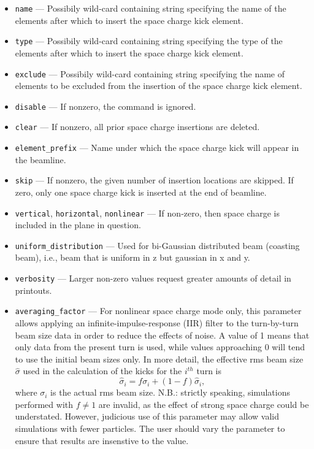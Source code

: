 \documentclass[11pt]{article}
\begin{document}
\begin{itemize}
\item \verb|name| --- Possibily wild-card containing string specifying the
	name of the elements after which to insert the space charge kick element.
\item \verb|type| --- Possibily wild-card containing string specifying the
        type of the elements after which to insert the space charge kick element.
\item \verb|exclude| --- Possibily wild-card containing string specifying 
	the name of elements to be excluded from the insertion of the space charge kick element.
\item \verb|disable| --- If nonzero, the command is ignored.
\item \verb|clear| --- If nonzero, all prior space charge insertions are deleted.
\item \verb|element_prefix| --- Name under which the space charge kick will appear in the beamline.
\item \verb|skip| --- If nonzero, the given number of insertion locations are skipped. 
        If zero, only one space charge kick is inserted at the end of beamline. 
\item \verb|vertical|, \verb|horizontal|, \verb|nonlinear| --- If non-zero, then space charge is
included in the plane in question.
\item \verb|uniform_distribution| --- Used for bi-Gaussian distributed beam (coasting beam), i.e., beam that is
  uniform in z but gaussian in x and y.
\item \verb|verbosity| --- Larger non-zero values request greater amounts of detail in printouts.
\item \verb|averaging_factor| --- For nonlinear space charge mode only, this parameter allows applying an infinite-impulse-response 
  (IIR) filter to the turn-by-turn beam size data in order to reduce the effects of noise. 
  A value of 1 means that only data from the present turn
  is used, while values approaching 0 will tend to use the initial beam sizes only.
  In more detail, the effective rms beam size $\hat{\sigma}$ used in the calculation of the kicks for the $i^{th}$ turn is 
  \begin{equation}
    \hat{\sigma}_i = f\sigma_i + (1-f) \hat{\sigma}_i,
  \end{equation}
  where $\sigma_i$ is the actual rms beam size.
  N.B.: strictly speaking, simulations performed with $f\ne 1$ are invalid, as the effect of strong space charge could
  be understated. However, judicious use of this parameter may allow valid simulations with fewer particles.
  The user should vary the parameter to ensure that results are insenstive to the value.
\end{itemize}
\end{document}
